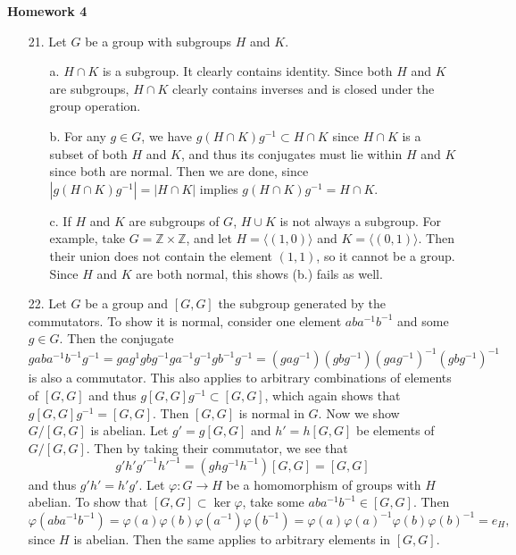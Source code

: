\documentclass[11pt, reqno]{article}
\theoremstyle{plain}
\theoremstyle{definition}
\theoremstyle{remark}
\renewcommand{\phi}{\varphi}
\newcommand{\ZZ}{\mathbb{Z}}
\begin{document}
\topmargin=-40pt
\renewcommand{\headrulewidth}{1pt}
\renewcommand{\headsep}{20pt}
\thispagestyle{fancy}

{\Huge \bfseries \noindent Homework 4}

\begin{enumerate}
    \item[21.] Let $G$ be a group with subgroups $H$ and $K$. \begin{enumerate}
        \item[a.] $H \cap K$ is a subgroup. It clearly contains identity. Since both $H$ and 
        $K$ are subgroups, $H \cap K$ clearly contains inverses and is closed under the group operation.

        \item[b.] For any $g \in G$, we have $g(H \cap K)g^{-1} \subset H \cap K$ since $H\cap K$ is a subset
        of both $H$ and $K$, and thus its conjugates must lie within $H$ and $K$ since both are normal. Then we 
        are done, since $|g(H \cap K)g^{-1}| = |H \cap K|$ implies $g(H \cap K)g^{-1} = H \cap K$.

        \item[c.] If $H$ and $K$ are subgroups of $G$, $H \cup K$ is not always a subgroup. For example, 
        take $G = \ZZ \times \ZZ$, and let $H = \langle (1,0)\rangle$ and $K = \langle (0,1)\rangle$. Then
        their union does not contain the element $(1,1)$, so it cannot be a group. Since $H$ and $K$
        are both normal, this shows (b.) fails as well. 
    \end{enumerate}

    \item[22.] Let $G$ be a group and $[G,G]$ the subgroup generated by the commutators. To show it is 
    normal, consider one element $aba^{-1}b^{-1}$ and some $g \in G$. Then the conjugate
    \[
        gaba^{-1}b^{-1}g^{-1} = gag^{1}gbg^{-1}ga^{-1}g^{-1}gb^{-1}g^{-1} = (gag^{-1})(gbg^{-1})(gag^{-1})^{-1}(gbg^{-1})^{-1}
    \]
    is also a commutator. This also applies to arbitrary combinations of elements of $[G, G]$ and
    thus $g[G,G]g^{-1} \subset [G,G]$, which again shows that $g[G,G]g^{-1} = [G,G]$. Then $[G,G]$ is normal
    in $G$. 
    \bigbreak
    Now we show $G/[G,G]$ is abelian. Let $g' = g[G,G]$ and $h' = h[G,G]$ 
    be elements of $G/[G,G]$. Then by taking their commutator, we see that 
    \[
        g'h'g'^{-1}h'^{-1} = (ghg^{-1}h^{-1})[G,G] = [G,G]
    \]
    and thus $g'h' = h'g'$.
    \bigbreak
    Let $\phi: G \rightarrow H$ be a homomorphism of groups with $H$ abelian. To show that $[G,G] \subset \ker \phi$,
    take some $aba^{-1}b^{-1} \in [G,G]$. Then 
    \[
        \phi(aba^{-1}b^{-1}) = \phi(a)\phi(b)\phi(a^{-1})\phi(b^{-1}) = \phi(a)\phi(a)^{-1}\phi(b)\phi(b)^{-1} = e_H,
    \]
    since $H$ is abelian. Then the same applies to arbitrary elements in $[G,G]$. 


\end{enumerate}
\end{document}
